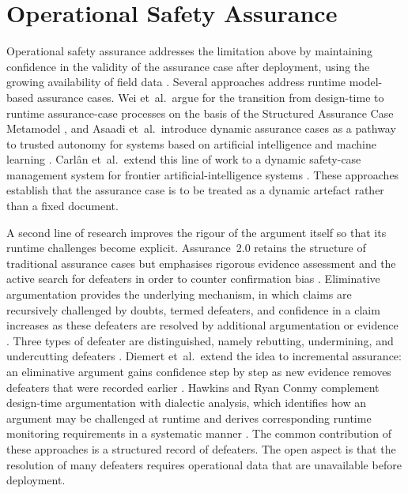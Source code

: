 \section{Operational Safety Assurance}
\label{sec:sota_operational}

Operational safety assurance addresses the limitation above by maintaining confidence
in the validity of the assurance case after deployment, using the growing
availability of field data \cite{laxman2024}. Several approaches address runtime
model-based assurance cases. Wei et~al.\ argue for
the transition from design-time to runtime assurance-case processes on the basis of
the Structured Assurance Case Metamodel \cite{wei2024access}, and Asaadi et~al.\
introduce dynamic assurance cases as a pathway to trusted autonomy for systems based
on artificial intelligence and machine learning \cite{asaadi2020dynamic}. Carl\^{a}n et~al.\ extend this line of work to a dynamic safety-case management system for frontier
artificial-intelligence systems \cite{carlan2024dynamic}. These approaches establish
that the assurance case is to be treated as a dynamic artefact rather than a fixed
document.

A second line of research improves the rigour of the argument itself so that its
runtime challenges become explicit. Assurance~2.0 retains the structure of
traditional assurance cases but emphasises rigorous evidence assessment and the
active search for defeaters in order to counter confirmation bias
\cite{bloomfield2020assurance2}. Eliminative argumentation provides the underlying
mechanism, in which claims are recursively challenged by doubts, termed defeaters,
and confidence in a claim increases as these defeaters are resolved by additional
argumentation or evidence \cite{goodenough2015ea}. Three types of defeater are
distinguished, namely rebutting, undermining, and undercutting defeaters
\cite{laxman2025}. Diemert et~al.\ extend the idea to incremental assurance: an eliminative
argument gains confidence step by step as new evidence removes defeaters that were
recorded earlier \cite{diemert2023incremental}. Hawkins
and Ryan Conmy complement design-time argumentation with dialectic analysis, which
identifies how an argument may be challenged at runtime and derives corresponding
runtime monitoring requirements in a systematic manner \cite{hawkins2023dialectic}.
The common contribution of these approaches is a structured record of defeaters. The open
aspect is that the resolution of many defeaters requires operational data that are
unavailable before deployment.

